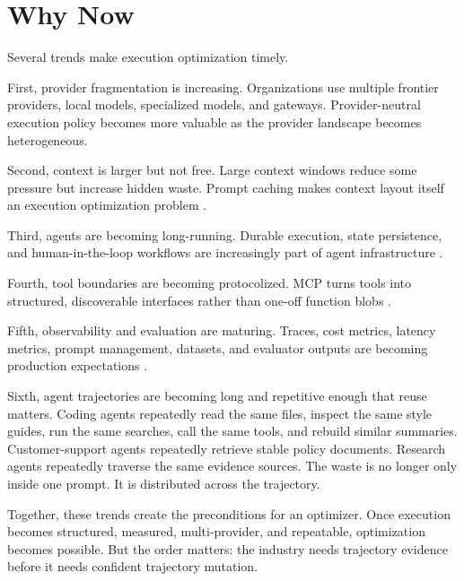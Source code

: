 \section{Why Now}

Several trends make execution optimization timely.

First, provider fragmentation is increasing. Organizations use multiple frontier providers, local models, specialized models, and gateways. Provider-neutral execution policy becomes more valuable as the provider landscape becomes heterogeneous.

Second, context is larger but not free. Large context windows reduce some pressure but increase hidden waste. Prompt caching makes context layout itself an execution optimization problem \citep{openai_prompt_caching,anthropic_prompt_caching}.

Third, agents are becoming long-running. Durable execution, state persistence, and human-in-the-loop workflows are increasingly part of agent infrastructure \citep{langgraph_overview,temporal_agents,openai_agents_running}.

Fourth, tool boundaries are becoming protocolized. MCP turns tools into structured, discoverable interfaces rather than one-off function blobs \citep{mcp_tools}.

Fifth, observability and evaluation are maturing. Traces, cost metrics, latency metrics, prompt management, datasets, and evaluator outputs are becoming production expectations \citep{langfuse_docs,otel_genai}.

Sixth, agent trajectories are becoming long and repetitive enough that reuse matters. Coding agents repeatedly read the same files, inspect the same style guides, run the same searches, call the same tools, and rebuild similar summaries. Customer-support agents repeatedly retrieve stable policy documents. Research agents repeatedly traverse the same evidence sources. The waste is no longer only inside one prompt. It is distributed across the trajectory.

Together, these trends create the preconditions for an optimizer. Once execution becomes structured, measured, multi-provider, and repeatable, optimization becomes possible. But the order matters: the industry needs trajectory evidence before it needs confident trajectory mutation.
